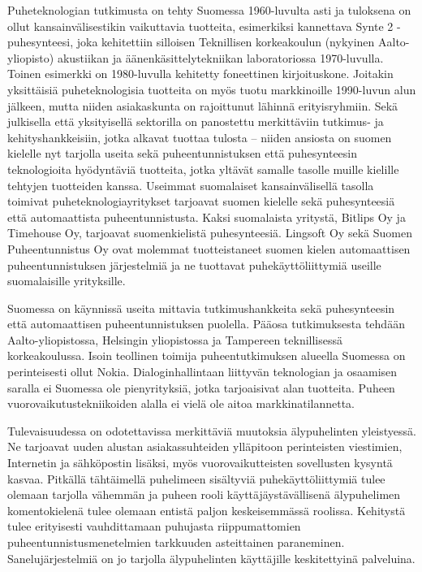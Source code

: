 \begin{multicols}{2}
  Puheteknologian tutkimusta on tehty Suomessa 1960-luvulta asti ja tuloksena on ollut kansainvälisestikin vaikuttavia tuotteita, esimerkiksi kannettava Synte 2 -puhesynteesi, joka kehitettiin silloisen Teknillisen korkeakoulun (nykyinen Aalto-yliopisto) akustiikan ja äänenkäsittelytekniikan laboratoriossa 1970-luvulla. Toinen esimerkki on 1980-luvulla kehitetty foneettinen kirjoituskone. Joitakin yksittäisiä puheteknologisia tuotteita on myös tuotu markkinoille 1990-luvun alun jälkeen, mutta niiden asiakaskunta on rajoittunut lähinnä erityisryhmiin. Sekä julkisella että yksityisellä sektorilla on panostettu merkittäviin tutkimus- ja kehityshankkeisiin, jotka alkavat tuottaa tulosta -- niiden ansiosta on suomen kielelle nyt tarjolla useita sekä puheentunnistuksen että puhesynteesin teknologioita hyödyntäviä tuotteita, jotka yltävät samalle tasolle muille kielille tehtyjen tuotteiden kanssa. Useimmat suomalaiset kansainvälisellä tasolla toimivat puheteknologiayritykset tarjoavat suomen kielelle sekä puhesynteesiä että automaattista puheentunnistusta. Kaksi suomalaista yritystä, Bitlips Oy ja Timehouse Oy, tarjoavat suomenkielistä puhesynteesiä. Lingsoft Oy sekä Suomen Puheentunnistus Oy ovat molemmat tuotteistaneet suomen kielen automaattisen puheentunnistuksen järjestelmiä ja ne tuottavat puhekäyttöliittymiä useille suomalaisille yrityksille.

Suomessa on käynnissä useita mittavia tutkimushankkeita sekä puhesynteesin että automaattisen puheentunnistuksen puolella. Pääosa tutkimuksesta tehdään Aalto-yliopistossa, Helsingin yliopistossa ja Tampereen teknillisessä korkeakoulussa. Isoin teollinen toimija puheentutkimuksen alueella Suomessa on perinteisesti ollut Nokia.
%
Dialoginhallintaan liittyvän teknologian ja osaamisen saralla ei Suomessa ole pienyrityksiä, jotka tarjoaisivat alan tuotteita. Puheen vuorovaikutustekniikoiden alalla ei vielä ole aitoa markkinatilannetta.

  Tulevaisuudessa on odotettavissa merkittäviä muutoksia älypuhelinten yleistyessä. Ne tarjoavat uuden alustan asiakassuhteiden ylläpitoon perinteisten viestimien, Internetin ja sähköpostin lisäksi, myös vuorovaikutteisten sovellusten kysyntä kasvaa. Pitkällä tähtäimellä puhelimeen sisältyviä puhekäyttöliittymiä tulee olemaan tarjolla vähemmän ja puheen rooli käyttäjäystävällisenä älypuhelimen komentokielenä tulee olemaan entistä paljon keskeisemmässä roolissa. Kehitystä tulee erityisesti vauhdittamaan puhujasta riippumattomien puheentunnistusmenetelmien tarkkuuden asteittainen paraneminen.  Sanelujärjestelmiä on jo tarjolla älypuhelinten käyttäjille keskitettyinä palveluina.


\end{multicols}
